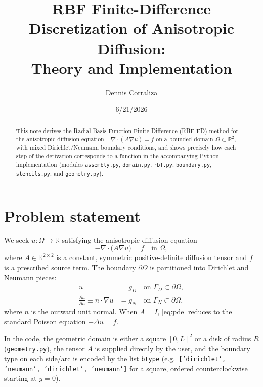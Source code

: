\documentclass[11pt]{article}
\title{RBF Finite-Difference Discretization of Anisotropic Diffusion:\\
Theory and Implementation}
\author{Dennis Corraliza}
\date{6/21/2026}
\newcommand{\R}{\mathbb{R}}
\newcommand{\diver}{\nabla\!\cdot}
\newcommand{\grad}{\nabla}
\begin{document}
\maketitle

\begin{abstract}
This note derives the Radial Basis Function Finite Difference (RBF-FD)
method for the anisotropic diffusion equation
$-\diver(A\grad u) = f$ on a bounded domain $\Omega \subset \R^2$,
with mixed Dirichlet/Neumann boundary conditions, and shows precisely how
each step of the derivation corresponds to a function in the
accompanying Python implementation (modules \texttt{assembly.py},
\texttt{domain.py}, \texttt{rbf.py}, \texttt{boundary.py},
\texttt{stencils.py}, and \texttt{geometry.py}).
\end{abstract}

\tableofcontents

\section{Problem statement}

We seek $u : \Omega \to \R$ satisfying the anisotropic diffusion
equation
\begin{equation}
  -\diver\!\big(A \grad u\big) = f \quad \text{in } \Omega,
  \label{eq:pde}
\end{equation}
where $A \in \R^{2\times 2}$ is a constant, symmetric positive-definite
diffusion tensor and $f$ is a prescribed source term. The boundary
$\partial\Omega$ is partitioned into Dirichlet and Neumann pieces:
\begin{align}
  u &= g_D \quad \text{on } \Gamma_D \subset \partial\Omega, \\
  \frac{\partial u}{\partial n} \equiv n \cdot \grad u &= g_N \quad
  \text{on } \Gamma_N \subset \partial\Omega,
  \label{eq:neumann-bc}
\end{align}
where $n$ is the outward unit normal. When $A = I$, \eqref{eq:pde}
reduces to the standard Poisson equation $-\Delta u = f$.

In the code, the geometric domain is either a square $[0,L]^2$ or a
disk of radius $R$ (\texttt{geometry.py}), the tensor $A$ is supplied
directly by the user, and the boundary type on each side/arc is
encoded by the list \texttt{btype} (e.g.\ \texttt{['dirichlet',
'neumann', 'dirichlet', 'neumann']} for a square, ordered
counterclockwise starting at $y=0$).
\end{document}
